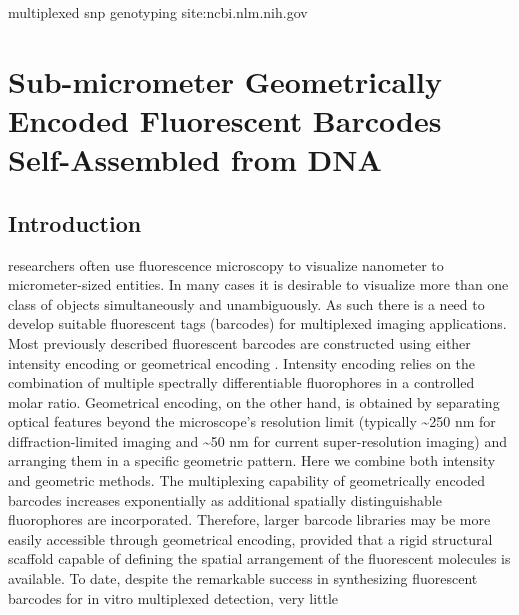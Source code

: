 



multiplexed snp genotyping site:ncbi.nlm.nih.gov

\chapter{Sub-micrometer Geometrically Encoded Fluorescent Barcodes Self-Assembled from DNA}

\section{Introduction}
 researchers often use fluorescence microscopy to visualize nanometer to micrometer-sized entities. In many cases it is desirable to visualize more than one class of objects simultaneously and unambiguously. As such there is a need to develop suitable 
fluorescent tags (barcodes) for multiplexed imaging applications. Most previously 
described fluorescent barcodes are constructed using either intensity encoding \citep{han_quantum-dot-tagged_2001,xu_multiplexed_2003,li_multiplexed_2005,livet_transgenic_2007,fournier-bidoz_facile_2008,lin_self-assembled_2007,marcon_--fly_2010} or 
geometrical encoding \citep{nicewarner-pena_submicrometer_2001,gudiksen_growth_2002,braeckmans_encoding_2003,dejneka_rare_2003,geiss_direct_2008,pregibon_multifunctional_2007,xiao_direct_2009,li_controlled_2010}. Intensity encoding relies on the combination of multiple 
spectrally differentiable fluorophores in a controlled molar ratio. Geometrical encoding, 
on the other hand, is obtained by separating optical features beyond the microscope’s 
resolution limit (typically \textasciitilde250 nm for diffraction-limited imaging and \textasciitilde 50 nm for 
current super-resolution imaging) and arranging them in a specific geometric pattern.
Here we combine both intensity and geometric methods. The multiplexing capability of geometrically encoded barcodes increases 
exponentially as additional spatially distinguishable fluorophores are incorporated. 
Therefore, larger barcode libraries may be more easily accessible through geometrical 
encoding, provided that a rigid structural scaffold capable of defining the spatial 
arrangement of the fluorescent molecules is available. To date, despite the remarkable 
success in synthesizing fluorescent barcodes for in vitro multiplexed detection, very little 
